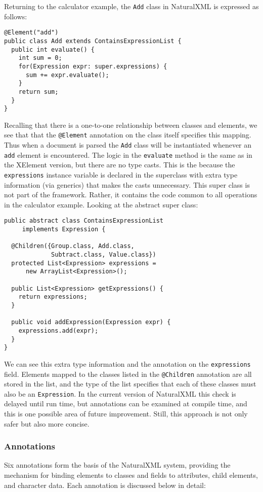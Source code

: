 Returning to the calculator example, the \lstinline'Add' class in
NaturalXML is expressed as follows:
\begin{lstlisting}
@Element("add")
public class Add extends ContainsExpressionList {
  public int evaluate() {
    int sum = 0;
    for(Expression expr: super.expressions) {
      sum += expr.evaluate();
    }
    return sum;
  }
}
\end{lstlisting}
Recalling that there is a one-to-one relationship between classes and
elements, we see that that the \lstinline{@Element} annotation on the
class itself specifies this mapping.  Thus when a document is parsed
the \lstinline'Add' class will be instantiated whenever an
\lstinline'add' element is encountered.  The logic in the
\lstinline'evaluate' method is the same as in the XElement version,
but there are no type casts.  This is the because the
\lstinline'expressions' instance variable is declared in the
superclass with extra type information (via generics) that makes the
casts unnecessary.  This super class is not part of the framework.
Rather, it contains the code common to all operations in the
calculator example.  Looking at the abstract super class:

\begin{lstlisting}
public abstract class ContainsExpressionList 
     implements Expression {
	
  @Children({Group.class, Add.class, 
             Subtract.class, Value.class})
  protected List<Expression> expressions = 
      new ArrayList<Expression>();
  
  public List<Expression> getExpressions() {
    return expressions;
  }
  
  public void addExpression(Expression expr) {
    expressions.add(expr);
  }
}   
\end{lstlisting}

We can see this extra type information and the annotation on the
\lstinline{expressions} field.  Elements mapped to the classes listed
in the \lstinline'@Children' annotation are all stored in the list,
and the type of the list specifies that each of these classes must
also be an \lstinline'Expression'.  In the current version of
NaturalXML this check is delayed until run time, but annotations can
be examined at compile time, and this is one possible area of future
improvement. Still, this approach is not only safer but also more
concise.

\subsubsection{Annotations}
Six annotations form the basis of the NaturalXML system, providing the
mechanism for binding elements to classes and fields to attributes, 
child elements, and character data.  Each
annotation is discussed below in detail:

